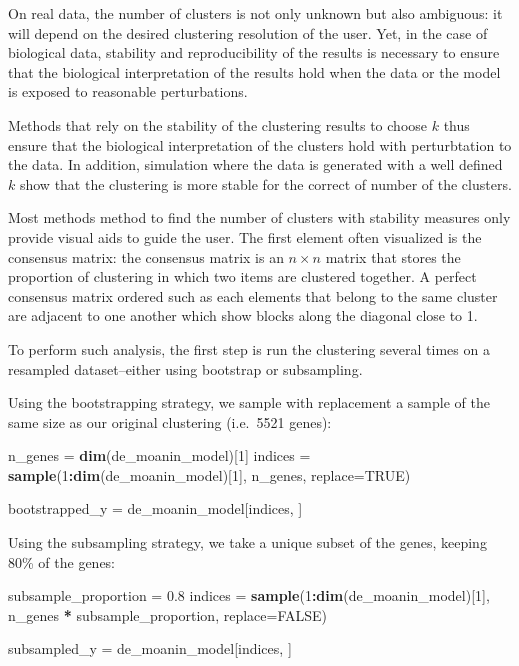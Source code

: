 \documentclass[9pt,a4paper,]{extarticle}
\newenvironment{Shaded}{\begin{snugshade}}{\end{snugshade}}
\newcommand{\DataTypeTok}[1]{\textcolor[rgb]{0.13,0.29,0.53}{#1}}
\newcommand{\DecValTok}[1]{\textcolor[rgb]{0.00,0.00,0.81}{#1}}
\newcommand{\FloatTok}[1]{\textcolor[rgb]{0.00,0.00,0.81}{#1}}
\newcommand{\KeywordTok}[1]{\textcolor[rgb]{0.13,0.29,0.53}{\textbf{#1}}}
\newcommand{\NormalTok}[1]{#1}
\newcommand{\OperatorTok}[1]{\textcolor[rgb]{0.81,0.36,0.00}{\textbf{#1}}}
\newcommand{\OtherTok}[1]{\textcolor[rgb]{0.56,0.35,0.01}{#1}}
\newcommand{\StringTok}[1]{\textcolor[rgb]{0.31,0.60,0.02}{#1}}
\begin{document}
On real data, the number of clusters is not only unknown but also
ambiguous: it will depend on the desired clustering resolution of the user.
Yet, in the case of biological data, stability and reproducibility of the
results is necessary to ensure that the biological interpretation of the
results hold when the data or the model is exposed to reasonable
perturbations.

Methods that rely on the stability of the clustering results to choose \(k\)
thus ensure that the biological interpretation of the clusters hold with
perturbtation to the data. In addition, simulation where the data is generated
with a well defined \(k\) show that the clustering is more stable for the
correct of number of the clusters.

Most methods method to find the number of clusters with stability measures
only provide visual aids to guide the user. The first element often visualized
is the consensus matrix: the consensus matrix is an \(n \times n\) matrix that
stores the proportion of clustering in which two items are clustered together.
A perfect consensus matrix ordered such as each elements that belong to the
same cluster are adjacent to one another which show blocks along the diagonal
close to 1.

To perform such analysis, the first step is run the clustering several times
on a resampled dataset--either using bootstrap or subsampling.

Using the bootstrapping strategy, we sample with replacement a sample of the
same size as our original clustering (i.e.~5521 genes):

\begin{Shaded}
\begin{Highlighting}[]
\NormalTok{n_genes =}\StringTok{ }\KeywordTok{dim}\NormalTok{(de_moanin_model)[}\DecValTok{1}\NormalTok{]}
\NormalTok{indices =}\StringTok{ }\KeywordTok{sample}\NormalTok{(}\DecValTok{1}\OperatorTok{:}\KeywordTok{dim}\NormalTok{(de_moanin_model)[}\DecValTok{1}\NormalTok{], n_genes, }\DataTypeTok{replace=}\OtherTok{TRUE}\NormalTok{)}

\NormalTok{bootstrapped_y =}\StringTok{ }\NormalTok{de_moanin_model[indices, ]}
\end{Highlighting}
\end{Shaded}

Using the subsampling strategy, we take a unique subset of the genes, keeping 80\% of the genes:

\begin{Shaded}
\begin{Highlighting}[]
\NormalTok{subsample_proportion =}\StringTok{ }\FloatTok{0.8}
\NormalTok{indices =}\StringTok{ }\KeywordTok{sample}\NormalTok{(}\DecValTok{1}\OperatorTok{:}\KeywordTok{dim}\NormalTok{(de_moanin_model)[}\DecValTok{1}\NormalTok{],}
\NormalTok{         n_genes }\OperatorTok{*}\StringTok{ }\NormalTok{subsample_proportion,}
         \DataTypeTok{replace=}\OtherTok{FALSE}\NormalTok{)}

\NormalTok{subsampled_y =}\StringTok{ }\NormalTok{de_moanin_model[indices, ]}
\end{Highlighting}
\end{Shaded}
\end{document}
